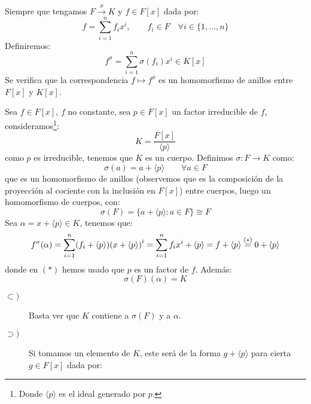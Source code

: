 \begin{definicion}
    Siempre que tengamos $F\stackrel{\sigma}{\to} K$ y $f\in F[x]$ dada por:
\begin{equation*}
    f = \sum_{i=1}^{n} f_i x^i, \qquad f_i \in F \quad \forall i \in \{1,\ldots,n\}
\end{equation*}
Definiremos:
\begin{equation*}
    f^\sigma = \sum_{i=1}^{n} \sigma(f_i) x^i \in K[x]
\end{equation*}
Se verifica que la correspondencia $f\mapsto f^\sigma$ es un homomorfismo de anillos entre $F[x]$ y $K[x]$.
\end{definicion}

\begin{ejemplo}
    Sea $f\in F[x]$, $f$ no constante, sea $p\in F[x]$ un factor irreducible de $f$, consideramos\footnote{Donde $\langle p \rangle $ es el ideal generado por $p$.}:
    \begin{equation*}
        K = \dfrac{F[x]}{\langle p \rangle }
    \end{equation*}
    como $p$ es irreducible, tenemos que $K$ es un cuerpo. Definimos $\sigma:F\to K$ como:
    \begin{equation*}
        \sigma(a) = a + \langle p \rangle  \qquad \forall a\in F
    \end{equation*}
    que es un homomorfismo de anillos (observemos que es la composición de la proyección al cociente con la inclusión en $F[x]$) entre cuerpos, luego un homomorfismo de cuerpos, con:
    \begin{equation*}
        \sigma(F) = \{a+\langle p \rangle : a\in F\} \cong F
    \end{equation*}
    Sea $\alpha = x+\langle p \rangle \in K$, tenemos que:
    \begin{equation*}
        f^\sigma(\alpha) = \sum_{i=1}^{n} (f_i + \langle p \rangle){(x+\langle p \rangle )}^{i} = \sum_{i=1}^{n} f_ix^i + \langle p \rangle  = f + \langle p \rangle  \stackrel{(\ast)}{=} 0 + \langle p \rangle 
    \end{equation*}
    donde en $(\ast)$ hemos usado que $p$ es un factor de $f$. Además:
    \begin{equation*}
        \sigma(F)(\alpha) = K
    \end{equation*}
    \begin{description}
        \item [$\subset )$] Basta ver que $K$ contiene a $\sigma(F)$ y a $\alpha$.
        \item [$\supset )$] Si tomamos un elemento de $K$, este será de la forma $g+\langle p \rangle $ para cierta $g\in F[x]$ dada por:

\end{description}
\end{ejemplo}
